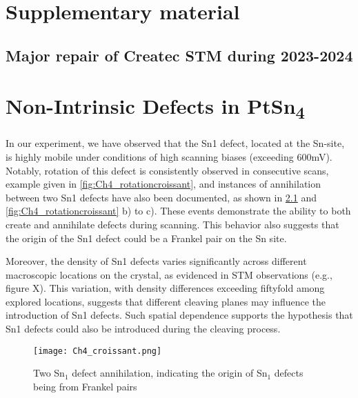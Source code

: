 \chapter{Supplementary material}
\section{Major repair of Createc STM during 2023-2024}\label{appen:fix}

\chapter{Non-Intrinsic Defects in PtSn\textsubscript{4}} \label{appen:non-intrinsic}
\par In our experiment, we have observed that the Sn1 defect, located at the Sn-site, is highly mobile under conditions of high scanning biases (exceeding 600mV). Notably, rotation of this defect is consistently observed in consecutive scans, example given in \ref{fig:Ch4_rotationcroissant}, and instances of annihilation between two Sn1 defects have also been documented, as shown in \ref{fig:Ch4_croissantannihilation} and \ref{fig:Ch4_rotationcroissant} b) to c). These events demonstrate the ability to both create and annihilate defects during scanning. This behavior also suggests that the origin of the Sn1 defect could be a Frankel pair on the Sn site. %
\par Moreover, the density of Sn1 defects varies significantly across different macroscopic locations on the crystal, as evidenced in STM observations (e.g., figure X). This variation, with density differences exceeding fiftyfold among explored locations, suggests that different cleaving planes may influence the introduction of Sn1 defects. Such spatial dependence supports the hypothesis that Sn1 defects could also be introduced during the cleaving process. 
\begin{figure}
	\centering
	\texttt{[image: Ch4\_croissant.png]}
	\caption{Two Sn$_1$ defect annihilation, indicating the origin of Sn$_1$ defects being from Frankel pairs}
	\label{fig:Ch4_croissantannihilation}
\end{figure}


